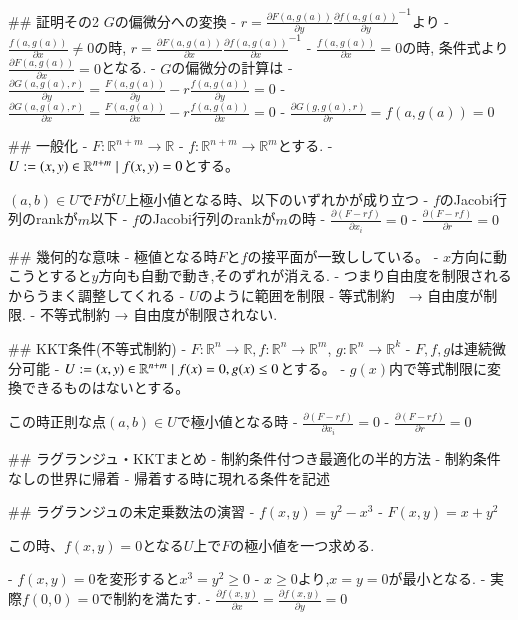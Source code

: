 \documentclass{ujarticle}
\begin{document}
## 証明その2 $G$の偏微分への変換
- $r= \frac{\partial F(a, g(a))}{\partial y} \frac{\partial f(a, g(a))}{\partial y}^{-1}$より
  - $\frac{f(a, g(a))}{\partial x} \neq 0$の時, $r= \frac{\partial F(a, g(a))}{\partial x} \frac{\partial f(a, g(a))}{\partial x}^{-1}$
  - $\frac{f(a, g(a))}{\partial x} = 0$の時, 条件式より$\frac{\partial F(a, g(a))}{\partial x} = 0$となる.
- $G$の偏微分の計算は
  - $\frac{\partial G(a, g(a), r)}{\partial y} = \frac{F(a, g(a))}{\partial y} - r \frac{f(a, g(a))}{\partial y} = 0$
  - $\frac{\partial G(a, g(a), r)}{\partial x} = \frac{F(a, g(a))}{\partial x} - r \frac{f(a, g(a))}{\partial x} = 0$
  - $\frac{\partial G(g, g(a), r)}{\partial r} = f(a, g(a)) = 0$

## 一般化
- $F: \mathbb{R}^{n+m} \to \mathbb{R}$
- $f: \mathbb{R}^{n+m} \to \mathbb{R}^m$とする.
- $U := \\{ (x,y) \in \mathbb{R}^{n+m} \mid f(x,y) = 0\\}$とする。

$(a, b) \in U$で$F$が$U$上極小値となる時、以下のいずれかが成り立つ
- $f$のJacobi行列のrankが$m$以下
- $f$のJacobi行列のrankが$m$の時
  - $\frac{ \partial (F - r f)}{\partial x_i} = 0$
  - $\frac{ \partial (F - r f)}{\partial r} = 0$

## 幾何的な意味
- 極値となる時$F$と$f$の接平面が一致ししている。
- $x$方向に動こうとすると$y$方向も自動で動き,そのずれが消える.
- つまり自由度を制限されるからうまく調整してくれる
- $U$のように範囲を制限
  - 等式制約　→ 自由度が制限.
  - 不等式制約 → 自由度が制限されない.

## KKT条件(不等式制約)
- $F: \mathbb{R}^{n} \to \mathbb{R}, f: \mathbb{R}^{n} \to \mathbb{R}^m$, $g: \mathbb{R}^{n} \to \mathbb{R}^k$
- $F,f, g$は連続微分可能
- $U := \\{(x,y) \in \mathbb{R}^{n+m} \mid f(x) = 0, g(x) \le 0\\}$とする。
- $g(x)$内で等式制限に変換できるものはないとする。

この時正則な点$(a,b) \in U$で極小値となる時
  - $\frac{ \partial (F - r f)}{\partial x_i} = 0$
  - $\frac{ \partial (F - r f)}{\partial r} = 0$

## ラグランジュ・KKTまとめ
- 制約条件付つき最適化の半的方法
- 制約条件なしの世界に帰着
- 帰着する時に現れる条件を記述


## ラグランジュの未定乗数法の演習
- $f(x, y) = y^2 - x^3$
- $F(x, y) = x + y^2$

この時、$f(x, y) = 0$となる$U$上で$F$の極小値を一つ求める.

- $f(x, y)  = 0$を変形すると$x^3 = y^2 \ge 0$
- $x \ge 0$より,$x = y =0$が最小となる.
- 実際$f(0, 0) = 0$で制約を満たす.
- $\frac{\partial f(x, y)}{\partial x} = \frac{\partial f(x, y)}{\partial y} = 0$
\end{document}
